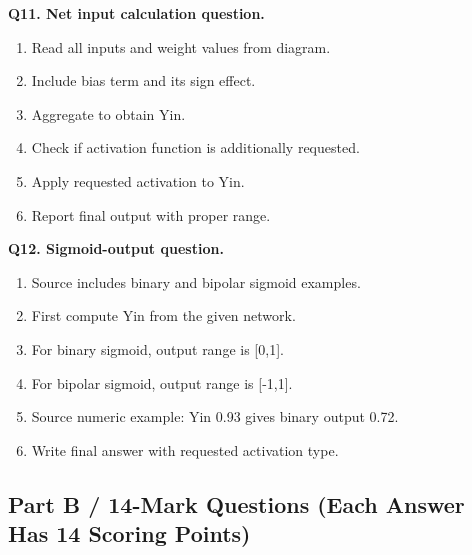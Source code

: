 \documentclass[11pt,a4paper]{article}
\begin{document}
\textbf{Q11. Net input calculation question.}
\begin{enumerate}
\item Read all inputs and weight values from diagram.
\item Include bias term and its sign effect.
\item Aggregate to obtain Yin.
\item Check if activation function is additionally requested.
\item Apply requested activation to Yin.
\item Report final output with proper range.
\end{enumerate}

\textbf{Q12. Sigmoid-output question.}
\begin{enumerate}
\item Source includes binary and bipolar sigmoid examples.
\item First compute Yin from the given network.
\item For binary sigmoid, output range is [0,1].
\item For bipolar sigmoid, output range is [-1,1].
\item Source numeric example: Yin 0.93 gives binary output 0.72.
\item Write final answer with requested activation type.
\end{enumerate}

\subsection*{Part B / 14-Mark Questions (Each Answer Has 14 Scoring Points)}
\end{document}
